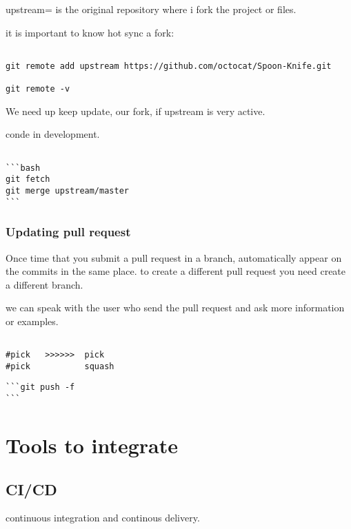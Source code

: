 \documentclass[10pt,a4paper]{article}
\begin{document}
upstream= is the original repository where i fork the project or files.


it is important to know hot sync a fork:
\begin{verbatim}

git remote add upstream https://github.com/octocat/Spoon-Knife.git

git remote -v 

\end{verbatim}


We need up keep update, our fork, if upstream is very active.


conde in development.

\begin{verbatim}

```bash
git fetch 
git merge upstream/master
```

\end{verbatim}

\subsubsection{Updating pull request}
Once time that you submit a pull request in a branch, automatically appear on the commits in the same place. to create a different pull request you need create a different branch.



we can speak with the user who send the pull request and ask more information or examples.


\begin{verbatim}

#pick   >>>>>>  pick
#pick           squash

\end{verbatim}

\begin{verbatim}
```git push -f
```
\end{verbatim}



\section{Tools to integrate}



\subsection{CI/CD}
continuous integration and continous
delivery.
\end{document}
